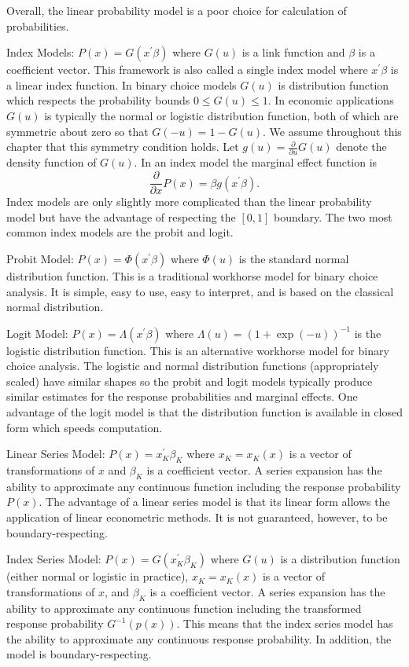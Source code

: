 \documentclass[10pt]{article}
\begin{document}
Overall, the linear probability model is a poor choice for calculation of probabilities.

Index Models: $P(x)=G\left(x^{\prime} \beta\right)$ where $G(u)$ is a link function and $\beta$ is a coefficient vector. This framework is also called a single index model where $x^{\prime} \beta$ is a linear index function. In binary choice models $G(u)$ is distribution function which respects the probability bounds $0 \leq G(u) \leq 1$. In economic applications $G(u)$ is typically the normal or logistic distribution function, both of which are symmetric about zero so that $G(-u)=1-G(u)$. We assume throughout this chapter that this symmetry condition holds. Let $g(u)=\frac{\partial}{\partial u} G(u)$ denote the density function of $G(u)$. In an index model the marginal effect function is
$$
\frac{\partial}{\partial x} P(x)=\beta g\left(x^{\prime} \beta\right) .
$$
Index models are only slightly more complicated than the linear probability model but have the advantage of respecting the $[0,1]$ boundary. The two most common index models are the probit and logit.

Probit Model: $P(x)=\Phi\left(x^{\prime} \beta\right)$ where $\Phi(u)$ is the standard normal distribution function. This is a traditional workhorse model for binary choice analysis. It is simple, easy to use, easy to interpret, and is based on the classical normal distribution.

Logit Model: $P(x)=\Lambda\left(x^{\prime} \beta\right)$ where $\Lambda(u)=(1+\exp (-u))^{-1}$ is the logistic distribution function. This is an alternative workhorse model for binary choice analysis. The logistic and normal distribution functions (appropriately scaled) have similar shapes so the probit and logit models typically produce similar estimates for the response probabilities and marginal effects. One advantage of the logit model is that the distribution function is available in closed form which speeds computation.

Linear Series Model: $P(x)=x_{K}^{\prime} \beta_{K}$ where $x_{K}=x_{K}(x)$ is a vector of transformations of $x$ and $\beta_{K}$ is a coefficient vector. A series expansion has the ability to approximate any continuous function including the response probability $P(x)$. The advantage of a linear series model is that its linear form allows the application of linear econometric methods. It is not guaranteed, however, to be boundary-respecting.

Index Series Model: $P(x)=G\left(x_{K}^{\prime} \beta_{K}\right)$ where $G(u)$ is a distribution function (either normal or logistic in practice), $x_{K}=x_{K}(x)$ is a vector of transformations of $x$, and $\beta_{K}$ is a coefficient vector. A series expansion has the ability to approximate any continuous function including the transformed response probability $G^{-1}(p(x))$. This means that the index series model has the ability to approximate any continuous response probability. In addition, the model is boundary-respecting.
\end{document}
